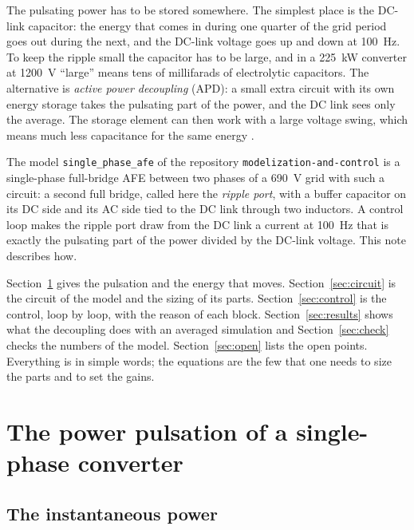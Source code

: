 \documentclass[11pt,a4paper]{scrartcl}
\newcommand{\code}[1]{\texttt{#1}}
\begin{document}
\begin{onehalfspace}
The pulsating power has to be stored somewhere. The simplest place is the DC-link capacitor: the energy that comes in during one quarter of the grid period goes out during the next, and the DC-link voltage goes up and down at \SI{100}{\hertz}. To keep the ripple small the capacitor has to be large, and in a \SI{225}{\kilo\watt} converter at \SI{1200}{\volt} ``large'' means tens of millifarads of electrolytic capacitors. The alternative is \emph{active power decoupling} (APD): a small extra circuit with its own energy storage takes the pulsating part of the power, and the DC link sees only the average. The storage element can then work with a large voltage swing, which means much less capacitance for the same energy \cite{krein2012,sun2016,hu2013}.

The model \code{single\_phase\_afe} of the repository \code{modelization-and-control} is a single-phase full-bridge AFE between two phases of a \SI{690}{\volt} grid with such a circuit: a second full bridge, called here the \emph{ripple port}, with a buffer capacitor on its DC side and its AC side tied to the DC link through two inductors. A control loop makes the ripple port draw from the DC link a current at \SI{100}{\hertz} that is exactly the pulsating part of the power divided by the DC-link voltage. This note describes how.

Section~\ref{sec:pulsation} gives the pulsation and the energy that moves. Section~\ref{sec:circuit} is the circuit of the model and the sizing of its parts. Section~\ref{sec:control} is the control, loop by loop, with the reason of each block. Section~\ref{sec:results} shows what the decoupling does with an averaged simulation and Section~\ref{sec:check} checks the numbers of the model. Section~\ref{sec:open} lists the open points. Everything is in simple words; the equations are the few that one needs to size the parts and to set the gains.

\section{The power pulsation of a single-phase converter}
\label{sec:pulsation}

\subsection{The instantaneous power}


\end{onehalfspace}
\end{document}
